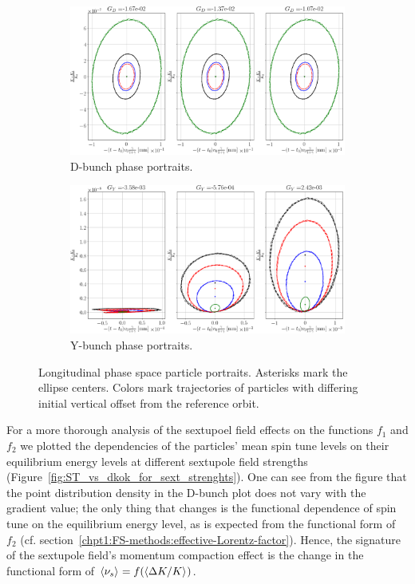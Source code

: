 \begin{figure}[h]
	\centering
	\begin{subfigure}{\linewidth}
		\includegraphics[width=\linewidth]{images/decoh_sim/propdef/long_phase_space_for_sext_settings_D}
		\caption{D-bunch phase portraits.}
	\end{subfigure}
	\begin{subfigure}{\linewidth}
		\includegraphics[width=\linewidth]{images/decoh_sim/propdef/long_phase_space_for_sext_settings_Y}
		\caption{Y-bunch phase portraits.}
	\end{subfigure}
	\caption{Longitudinal phase space particle portraits. Asterisks mark the ellipse centers.
		Colors mark trajectories of particles with differing initial vertical offset from the reference orbit.\label{fig:long_PS_sext_settings}}
\end{figure}

For a more thorough analysis of the sextupoel field effects on the functions $f_1$ and $f_2$ we plotted the
dependencies of the particles' mean spin tune levels on their equilibrium energy levels at different
sextupole field strengths (Figure~\ref{fig:ST_vs_dkok_for_sext_strenghts}). One can see from the figure 
that the point distribution density in the D-bunch plot does not vary with the gradient value; the only thing 
that changes is the functional dependence of spin tune on the equilibrium energy level, as is expected from
the functional form of $f_2$ (cf. section~\ref{chpt1:FS-methods:effective-Lorentz-factor}). Hence, the 
signature of the sextupole field's momentum compaction effect is the change in the functional form of
 $\avg{\nu_s} = f(\avg{\Delta K/K})$.

